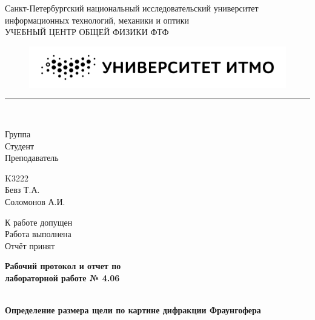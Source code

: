 \documentclass{article}
\begin{document}
\begin{minipage}{0.62\textwidth}
    \begin{center}
        Санкт-Петербургский национальный исследовательский университет \\
        информационных технологий, механики и оптики \\
        УЧЕБНЫЙ ЦЕНТР ОБЩЕЙ ФИЗИКИ ФТФ
    \end{center}
\end{minipage}
\hfill
\begin{minipage}{0.38\textwidth}
    \centering
    \begin{figure}[H]
    \includegraphics[width=\textwidth]{logo.png}
    \end{figure}
\end{minipage}

\rule{\textwidth}{1pt} \\

\begin{minipage}{0.16\textwidth}
        Группа \hrulefill\\
        Студент \hrulefill\\
        Преподаватель \hrulefill
\end{minipage}%
\begin{minipage}{0.25\textwidth}
        K3222\hrulefill\\
        Бевз Т.А.\hrulefill\\
        Соломонов А.И.\hrulefill
\end{minipage}
\hfill
\begin{minipage}{0.47\textwidth}
        К работе допущен \hrulefill\\
        Работа выполнена \hrulefill\\
        Отчёт принят \hrulefill
\end{minipage}
\begin{center}
    \textbf{\huge Рабочий протокол и отчет по \\
    лабораторной работе № 4.06}
\end{center}
\begin{minipage}{1\textwidth}
        \hrulefill\\
        \Large\textbf{Определение размера щели по картине дифракции Фраунгофера}\hrulefill
\end{minipage}
\end{document}

